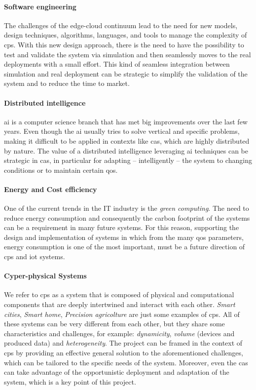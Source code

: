 \documentclass[12pt]{article}
\begin{document}
\paragraph{Software engineering}
The challenges of the edge-cloud continuum lead to the need for new models,
design techniques, algorithms, languages, and tools to manage the complexity
of \ac{cps}.
%
With this new design approach,
there is the need to have the possibility to test and validate the system via simulation
and then seamlessly moves to the real deployments with a small effort.
%
This kind of seamless integration between simulation and real deployment can be strategic
to simplify the validation of the system and to reduce the time to market.

\paragraph{Distributed intelligence}
\ac{ai} is a computer science branch that has met big improvements over the last few years.
%
Even though the \ac{ai} usually tries to solve vertical and specific problems,
making it difficult to be applied in contexts like \ac{cas},
which are highly distributed by nature.
%
The value of a distributed intelligence leveraging \ac{ai} techniques can be strategic in \ac{cas},
in particular for adapting -- intelligently -- the system to changing conditions or to maintain certain \ac{qos}.


\paragraph{Energy and Cost efficiency}
One of the current trends in the IT industry is the \emph{green computing}.
%
The need to reduce energy consumption and consequently the carbon footprint of the systems can be a requirement in many future systems.
%
For this reason,
supporting the design and implementation of systems in which from the many \ac{qos} parameters,
energy consumption is one of the most important,
must be a future direction of \ac{cps} and \ac{iot} systems.

\paragraph{Cyper-physical Systems}
We refer to \ac{cps} as a system that is composed of physical and computational components
that are deeply intertwined and interact with each other.
%
\emph{Smart cities}, \emph{Smart home}, \emph{Precision agricolture} are just some examples of \ac{cps}.
%
All of these systems can be very different from each other,
but they share some characteristics and challenges,
for example: \emph{dynamicity}, \emph{volume} (devices and produced data) and \emph{heterogeneity}.
%
The project can be framed in the context of \ac{cps} by providing an effective general solution to the aforementioned challenges,
which can be tailored to the specific needs of the system.
%
Moreover,
even the \ac{cas} can take advantage of the opportunistic deployment and adaptation of the system,
which is a key point of this project.
\end{document}
